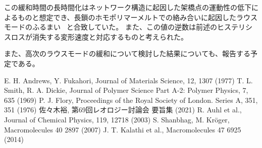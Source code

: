 \documentclass[uplatex,10pt,a4paper,twocolumn]{jsarticle}
\begin{document}
この緩和時間の長時間化はネットワーク構造に起因した架橋点の運動性の低下によるものと想定でき、長鎖のホモポリマーメルトでの絡み合いに起因したラウスモードのふるまい~\cite{rubinstein} と合致していた。
また、この値の逆数は前述のヒステリシスロスが消失する変形速度と対応するものと考えられた。


また、高次のラウスモードの緩和について検討した結果についても、報告する予定である。

\begin{thebibliography}{99}
	 E. H. Andrews, Y. Fukahori, Journal of Materials Science, 12, 1307 (1977)
	 T. L. Smith, R. A. Dickie, Journal of Polymer Science Part A-2: Polymer Physics, 7, 635 (1969)
	 P. J. Flory, Proceedings of the Royal Society of London. Series A, 351, 351 (1976)
	 佐々木裕, 第69回レオロジー討論会 要旨集 (2021)
	 R. Auhl et al., Journal of Chemical Physics, 119, 12718 (2003)
	 S. Shanbhag, M. Kr\"{o}ger, Macromolecules 40 2897 (2007)
	 J. T. Kalathi et al., Macromolecules 47 6925 (2014)
\end{thebibliography}
% 
% 
\end{document}
